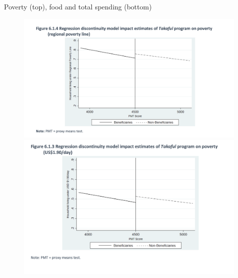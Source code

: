 \documentclass{beamer}
\begin{document}
\begin{frame}{Poverty (top), food and total spending (bottom)}
    \begin{figure}
        \centering
        \begin{minipage}{0.5\textwidth}
            \includegraphics[width=\textwidth]{./lecture_includes/takaful_rdd4.png}
        \end{minipage}\hfill
        \begin{minipage}{0.5\textwidth}
            \includegraphics[width=\textwidth]{./lecture_includes/takaful_rdd3.png}
        \end{minipage}

        \vspace{0.5cm} %


\end{figure}
\end{frame}
\end{document}
